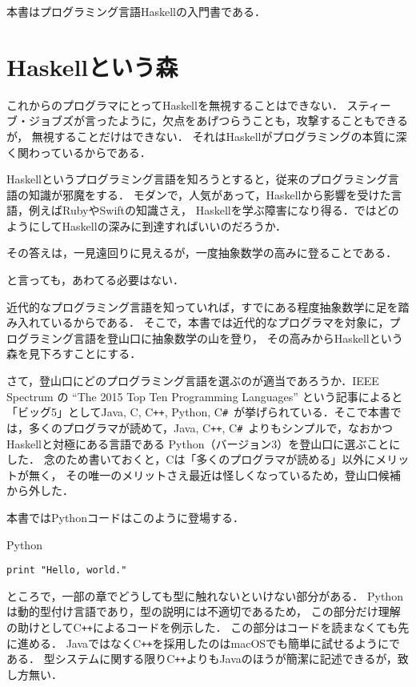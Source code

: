 \documentclass[a5paper,draft]{jsbook}
\newcommand{\programminglanguage}[1]{\textsf{#1}}
\newcommand{\clang}{\programminglanguage{C}}
\newcommand{\csharp}{\programminglanguage{C}\texttt{\#}}
\newcommand{\cxx}{\programminglanguage{C}\texttt{++}}
\newcommand{\haskell}{\programminglanguage{Haskell}}
\newcommand{\java}{\programminglanguage{Java}}
\newcommand{\python}{\programminglanguage{Python}}
\newcommand{\ruby}{\programminglanguage{Ruby}}
\newcommand{\swift}{\programminglanguage{Swift}}
\newenvironment{leader}{\begingroup}{\endgroup}
\newenvironment{pythoncode}{\begin{itembox}[r]{\python}}{\end{itembox}}
\begin{document}
\begin{leader}
本書はプログラミング言語\haskell の入門書である．
\end{leader}

\section{\haskell という森}

これからのプログラマにとって\haskell を無視することはできない．
スティーブ・ジョブズが言ったように，欠点をあげつらうことも，攻撃することもできるが，
無視することだけはできない．
それは\haskell がプログラミングの本質に深く関わっているからである．

\haskell というプログラミング言語を知ろうとすると，従来のプログラミング言語の知識が邪魔をする．
モダンで，人気があって，\haskell から影響を受けた言語，例えば\ruby や\swift の知識さえ，
\haskell を学ぶ障害になり得る．ではどのようにして\haskell の深みに到達すればいいのだろうか．

その答えは，一見遠回りに見えるが，一度抽象数学の高みに登ることである．

と言っても，あわてる必要はない．

近代的なプログラミング言語を知っていれば，すでにある程度抽象数学に足を踏み入れているからである．
そこで，本書では近代的なプログラマを対象に，プログラミング言語を登山口に抽象数学の山を登り，
その高みから\haskell という森を見下ろすことにする．

さて，登山口にどのプログラミング言語を選ぶのが適当であろうか．IEEE Spectrum の ``The 2015
Top Ten Programming Languages'' という記事によると「ビッグ5」として\java, \clang,
\cxx, \python, \csharp\ が挙げられている．そこで本書では，多くのプログラマが読めて，\java,
\cxx, \csharp\ よりもシンプルで，なおかつ\haskell と対極にある言語である
\python（バージョン3）を登山口に選ぶことにした．
念のため書いておくと，\clang は「多くのプログラマが読める」以外にメリットが無く，
その唯一のメリットさえ最近は怪しくなっているため，登山口候補から外した．

本書では\python コードはこのように登場する．
\begin{pythoncode}
\begin{verbatim}
print "Hello, world."
\end{verbatim}
\end{pythoncode}

ところで，一部の章でどうしても型に触れないといけない部分がある．
\python は動的型付け言語であり，型の説明には不適切であるため，
この部分だけ理解の助けとして\cxx によるコードを例示した．
この部分はコードを読まなくても先に進める．
\java ではなく\cxx を採用したのはmacOSでも簡単に試せるようにである．
型システムに関する限り\cxx よりも\java のほうが簡潔に記述できるが，致し方無い．
\end{document}
